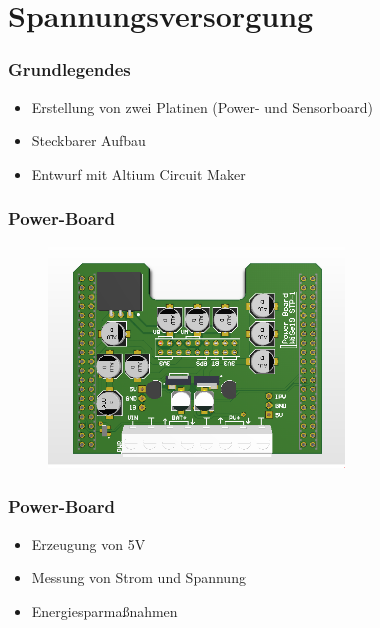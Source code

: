 \documentclass{beamer}
\begin{document}
\section{Spannungsversorgung}
\begin{frame}
\frametitle{Grundlegendes}
\begin{itemize}
\item Erstellung von zwei Platinen (Power- und Sensorboard)
\item Steckbarer Aufbau
\item Entwurf mit Altium Circuit Maker
\end{itemize}

\end{frame}
\begin{frame}
  \frametitle{Power-Board}
  \begin{figure}[H]
    \centering
    \includegraphics[width=0.7\textwidth]{./img/PCB_Power_3D_top.PNG}
  \end{figure}
\end{frame}

\begin{frame}
  \frametitle{Power-Board}
	\begin{itemize}
		\item Erzeugung von 5V
		\item Messung von Strom und Spannung
		\item Energiesparmaßnahmen
	\end{itemize}

\end{frame}
\end{document}
